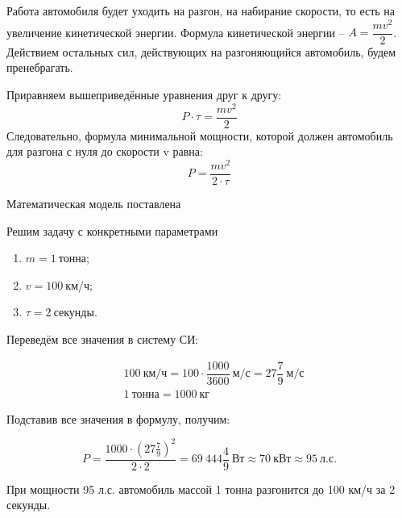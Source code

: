 \documentclass[a4paper, 14pt, titlepage, fleqn]{extarticle}
\begin{document}
            Работа автомобиля будет уходить на разгон, на набирание скорости, то есть на увеличение кинетической энергии.
            Формула кинетической энергии -- \(A = \dfrac{m v^2}{2}\).
            Действием остальных сил, действующих на разгоняющийся автомобиль, будем пренебрагать.

            Приравняем вышеприведённые уравнения друг к другу:
            \[P \cdot \tau = \dfrac{m v^2}{2}\]
            Следовательно, формула минимальной мощности, которой должен автомобиль для разгона с нуля до скорости v равна:
            \[P = \dfrac{m v^2}{2 \cdot \tau}\]
            
            Математическая модель поставлена

            Решим задачу с конкретными параметрами
            
            \begin{enumerate}
                \item $m = 1 \ \text{тонна}$;
                \item $v = 100 \ \text{км/ч} $;
                \item $\tau = 2 \ \text{секунды}$.
            \end{enumerate}

            Переведём все значения в систему СИ:

            \[\begin{split}
                & 100 \ \text{км/ч} = 100 \cdot \dfrac{1000}{3600} \ \text{м/с} = 27 \dfrac{7}{9} \ \text{м/с} \\
                & 1 \ \text{тонна} = 1000 \ \text{кг}
            \end{split}\]

            Подставив все значения в формулу, получим:

            \[ P = \dfrac{ 1000 \cdot \left(27 \tfrac{7}{9}\right)^2}{2 \cdot 2} = 69 \ 444 \dfrac{4}{9} \ \text{Вт} \approx 70 \ \text{кВт} \approx 95 \ \text{л.с.}\]
            
        При мощности 95 л.с. автомобиль массой 1 тонна разгонится до 100 км/ч за 2 секунды.
\end{document}
